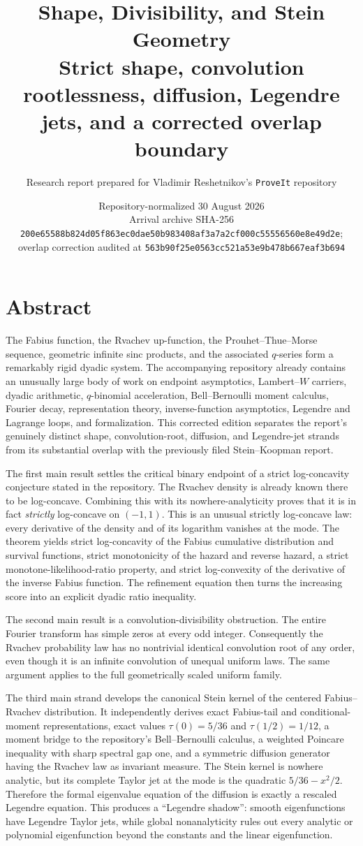 \documentclass[11pt,oneside]{article}
\title{\bfseries Shape, Divisibility, and Stein Geometry\\[0.35em]
\large Strict shape, convolution rootlessness, diffusion, Legendre jets, and a corrected overlap boundary}
\author{Research report prepared for Vladimir Reshetnikov's \texttt{ProveIt} repository}
\date{Repository-normalized 30 August 2026\\
\small Arrival archive SHA-256 \nolinkurl{200e65588b824d05f863ec0dae50b983408af3a7a2cf000c55556560e8e49d2e};\\
\small overlap correction audited at \nolinkurl{563b90f25e0563cc521a53e9b478b667eaf3b694}}
\theoremstyle{definition}
\theoremstyle{remark}
\begin{document}
\maketitle

\section*{Abstract}
The Fabius function, the Rvachev up-function, the Prouhet--Thue--Morse sequence,
geometric infinite sinc products, and the associated $q$-series form a remarkably
rigid dyadic system.  The accompanying repository already contains an unusually
large body of work on endpoint asymptotics, Lambert--$W$ carriers, dyadic arithmetic,
$q$-binomial acceleration, Bell--Bernoulli moment calculus, Fourier decay,
representation theory, inverse-function asymptotics, Legendre and Lagrange loops,
and formalization.  This corrected edition separates the report's genuinely
distinct shape, convolution-root, diffusion, and Legendre-jet strands from its
substantial overlap with the previously filed Stein--Koopman report.

The first main result settles the critical binary endpoint of a strict
log-concavity conjecture stated in the repository.  The Rvachev density is already
known there to be log-concave.  Combining this with its nowhere-analyticity proves
that it is in fact \emph{strictly} log-concave on $(-1,1)$.  This is an unusual
strictly log-concave law: every derivative of the density and of its logarithm
vanishes at the mode.  The theorem yields strict log-concavity of the Fabius
cumulative distribution and survival functions, strict monotonicity of the hazard
and reverse hazard, a strict monotone-likelihood-ratio property, and strict
log-convexity of the derivative of the inverse Fabius function.  The refinement
equation then turns the increasing score into an explicit dyadic ratio inequality.

The second main result is a convolution-divisibility obstruction.  The entire
Fourier transform has simple zeros at every odd integer.  Consequently the
Rvachev probability law has no nontrivial identical convolution root of any order,
even though it is an infinite convolution of unequal uniform laws.  The same
argument applies to the full geometrically scaled uniform family.

The third main strand develops the canonical Stein kernel of the centered
Fabius--Rvachev distribution.  It independently derives exact Fabius-tail and
conditional-moment
representations, exact values $\tau(0)=5/36$ and $\tau(1/2)=1/12$, a moment bridge
to the repository's Bell--Bernoulli calculus, a weighted Poincare inequality with
sharp spectral gap one, and a symmetric diffusion generator having the Rvachev
law as invariant measure.  The Stein kernel is nowhere analytic, but its complete
Taylor jet at the mode is the quadratic $5/36-x^2/2$.  Therefore the formal
eigenvalue equation of the diffusion is exactly a rescaled Legendre equation.
This produces a ``Legendre shadow'': smooth eigenfunctions have Legendre
Taylor jets, while global nonanalyticity rules out every analytic or polynomial
eigenfunction beyond the constants and the linear eigenfunction.
\end{document}
